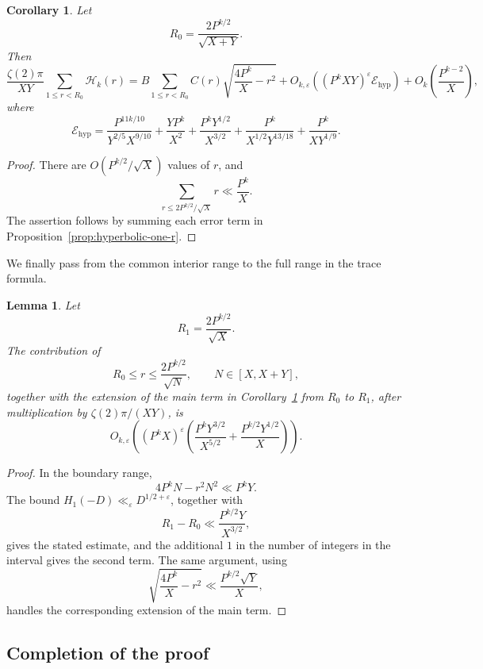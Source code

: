 \documentclass[12pt,reqno]{amsart}
\numberwithin{equation}{section}
\theoremstyle{plain}
\newtheorem{lemma}[theorem]{Lemma}
\newtheorem{corollary}[theorem]{Corollary}
\theoremstyle{definition}
\theoremstyle{remark}
\begin{document}
\begin{corollary}\label{cor:hyperbolic-interior}
Let
\[
R_0=\frac{2P^{k/2}}{\sqrt{X+Y}}.
\]
Then
\begin{equation*}
\frac{\zeta(2)\pi}{XY}
\sum_{1\leq r<R_0}\mathcal H_k(r)
=
B\sum_{1\leq r<R_0}
C(r)\sqrt{\frac{4P^k}{X}-r^2}
+
O_{k,\varepsilon}\left((P^kXY)^\varepsilon\mathcal E_{\mathrm{hyp}}\right)
+O_k\left(\frac{P^{k-2}}X\right),
\end{equation*}
where
\begin{equation*}
\mathcal E_{\mathrm{hyp}}
=
\frac{P^{11k/10}}{Y^{2/5}X^{9/10}}
+
\frac{YP^k}{X^2}
+
\frac{P^kY^{1/2}}{X^{3/2}}
+
\frac{P^k}{X^{1/2}Y^{13/18}}
+
\frac{P^k}{XY^{1/9}}.
\end{equation*}
\end{corollary}

\begin{proof}
There are $O(P^{k/2}/\sqrt X)$ values of $r$, and
\[
\sum_{r\leq 2P^{k/2}/\sqrt X}r
\ll\frac{P^k}{X}.
\]
The assertion follows by summing each error term in Proposition~\ref{prop:hyperbolic-one-r}.
\end{proof}

We finally pass from the common interior range to the full range in the trace formula.

\begin{lemma}\label{lem:hyperbolic-boundary}
Let
\[
R_1=\frac{2P^{k/2}}{\sqrt X}.
\]
The contribution of
\[
R_0\leq r\leq\frac{2P^{k/2}}{\sqrt N},
\qquad
N\in[X,X+Y],
\]
together with the extension of the main term in Corollary~\ref{cor:hyperbolic-interior} from $R_0$ to $R_1$, after
multiplication by $\zeta(2)\pi/(XY)$, is
\[
O_{k,\varepsilon}\left(
(P^kX)^\varepsilon
\left(
\frac{P^kY^{3/2}}{X^{5/2}}
+
\frac{P^{k/2}Y^{1/2}}{X}
\right)
\right).
\]
\end{lemma}

\begin{proof}
In the boundary range,
\[
4P^kN-r^2N^2\ll P^kY.
\]
The bound $H_1(-D)\ll_\varepsilon D^{1/2+\varepsilon}$, together with
\[
R_1-R_0\ll\frac{P^{k/2}Y}{X^{3/2}},
\]
gives the stated estimate, and the additional $1$ in the number of integers in the interval gives the second term.
The same argument, using
\[
\sqrt{\frac{4P^k}{X}-r^2}
\ll\frac{P^{k/2}\sqrt Y}{X},
\]
handles the corresponding extension of the main term.
\end{proof}

\subsection{Completion of the proof}
\end{document}
